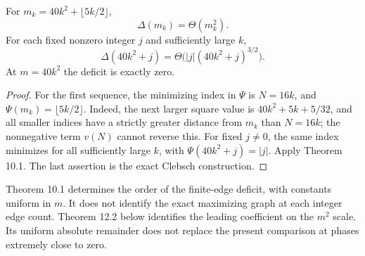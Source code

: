 \begin{corollary}
\label{cor:arithmetic-optimality}
For $m_k=40k^2+\lfloor5k/2\rfloor$,
\[
 \Delta(m_k)=\Theta(m_k^2).
\]
For each fixed nonzero integer $j$ and sufficiently large $k$,
\[
 \Delta(40k^2+j)=\Theta\bigl(|j|(40k^2+j)^{3/2}\bigr).
\]
At $m=40k^2$ the deficit is exactly zero.
\end{corollary}

\begin{proof}
For the first sequence, the minimizing index in $\Psi$ is $N=16k$, and
$\Psi(m_k)=\lfloor5k/2\rfloor$. Indeed, the next larger square value is
$40k^2+5k+5/32$, and all smaller indices have a strictly greater distance
from $m_k$ than $N=16k$; the nonnegative term $v(N)$ cannot reverse this.
For fixed $j\ne0$, the same index minimizes for all sufficiently large
$k$, with $\Psi(40k^2+j)=|j|$. Apply Theorem 10.1. The last assertion is
the exact Clebsch construction.
\end{proof}

\begin{remark}\label{rem:arithmetic-scale}
Theorem 10.1 determines the order of the finite-edge deficit, with constants
uniform in $m$. It does not identify the exact maximizing graph at each
integer edge count. Theorem 12.2 below identifies the leading coefficient
on the $m^2$ scale. Its uniform absolute remainder does not replace the
present comparison at phases extremely close to zero.
\end{remark}
